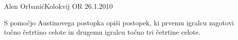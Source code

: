 \begin{naloga}{Alen Orbanić}{Kolokvij OR 26.1.2010}
\begin{vprasanje}
S pomočjo Austinovega postopka opiši postopek,
ki prvemu igralcu zagotovi točno četrtino celote
in drugemu igralcu točno tri četrtine celote.
\end{vprasanje}
\begin{odgovor}
\end{odgovor}
\end{naloga}
